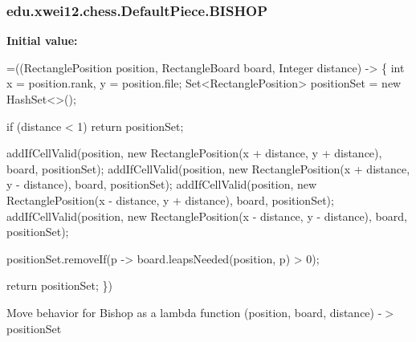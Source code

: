 \subsubsection[{\texorpdfstring{B\+I\+S\+H\+OP}{BISHOP}}]{\setlength{\rightskip}{0pt plus 5cm}edu.\+xwei12.\+chess.\+Default\+Piece.\+B\+I\+S\+H\+OP}\hypertarget{enumedu_1_1xwei12_1_1chess_1_1_default_piece_aef91d35be3261782e80df06a566be2f6}{}\label{enumedu_1_1xwei12_1_1chess_1_1_default_piece_aef91d35be3261782e80df06a566be2f6}
{\bfseries Initial value\+:}
\begin{DoxyCode}
=((RectanglePosition position, RectangleBoard board, Integer distance) -> \{
        \textcolor{keywordtype}{int} x = position.rank, y = position.file;
        Set<RectanglePosition> positionSet = \textcolor{keyword}{new} HashSet<>();

        
        \textcolor{keywordflow}{if} (distance < 1) \textcolor{keywordflow}{return} positionSet;

        
        addIfCellValid(position, \textcolor{keyword}{new} RectanglePosition(x + distance, y + distance), board, positionSet);
        addIfCellValid(position, \textcolor{keyword}{new} RectanglePosition(x + distance, y - distance), board, positionSet);
        addIfCellValid(position, \textcolor{keyword}{new} RectanglePosition(x - distance, y + distance), board, positionSet);
        addIfCellValid(position, \textcolor{keyword}{new} RectanglePosition(x - distance, y - distance), board, positionSet);

        
        positionSet.removeIf(p -> board.leapsNeeded(position, p) > 0);

        \textcolor{keywordflow}{return} positionSet;
    \})
\end{DoxyCode}
Move behavior for Bishop as a lambda function (position, board, distance) -\/$>$ position\+Set 
